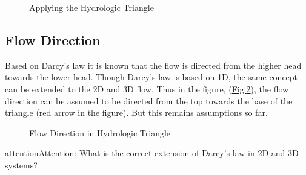\documentclass[letterpaper,10pt,english]{jupyterBook}
\begin{document}
\begin{figure}[htbp]
\centering
\capstart

\noindent{}
\caption{Applying the Hydrologic Triangle}\label{\detokenize{content/flow/L6/16_darcy_law_3D:hydro-tri2}}\end{figure}


\subsection{Flow Direction}
\label{\detokenize{content/flow/L6/16_darcy_law_3D:flow-direction}}
\sphinxAtStartPar
Based on Darcy’s law it is known that the flow is directed from the higher head towards the lower head. Though Darcy’s law is based on 1D, the same concept can be extended to the 2D and 3D flow. Thus in the figure, (\hyperref[\detokenize{content/flow/L6/16_darcy_law_3D:hydro-tri3}]{Fig.\@ \ref{\detokenize{content/flow/L6/16_darcy_law_3D:hydro-tri3}}}), the flow direction can be assumed to be directed from the top towards the base of the triangle (red arrow in the figure). But this remains assumptions so far.

\begin{figure}[htbp]
\centering
\capstart

\noindent{}
\caption{Flow Direction in Hydrologic Triangle}\label{\detokenize{content/flow/L6/16_darcy_law_3D:hydro-tri3}}\end{figure}

\begin{sphinxadmonition}{attention}{Attention:}
\sphinxAtStartPar
What is the correct extension of Darcy’s law\sphinxhyphen{} in 2D and 3D systems?
\end{sphinxadmonition}
\end{document}
